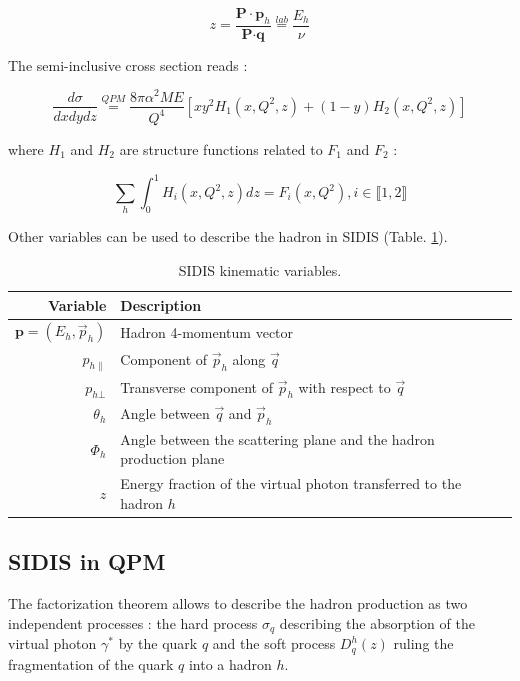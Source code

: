 \begin{equation}
  z = \frac{\textbf{P}\cdot\textbf{p}_h}{\textbf{P}\cdot\textbf{q}} \stackrel{lab}{=} \frac{E_h}{\nu}
  \label{eq:SIDIS}
\end{equation}

The semi-inclusive cross section reads \cite{SIDISXS}:

\begin{equation}
  \frac{d\sigma}{dxdydz} \stackrel{QPM}{=} \frac{8\pi\alpha^2ME}{Q^4}\left[xy^2H_1(x,Q^2,z)+(1-y)H_2(x,Q^2,z)\right]
  \label{eq:SIDISXS}
\end{equation}

where $H_1$ and $H_2$ are structure functions related to $F_1$ and $F_2$ \cite{SF} :

\begin{equation}
  \sum\limits_{h}\int_{0}^{1} H_i(x,Q^2,z)dz = F_i(x,Q^2), i \in  \llbracket1,2\rrbracket
\end{equation}

Other variables can be used to describe the hadron in SIDIS (Table. \ref{tab:SIDIS}).

\begin{table}[h!]
  \caption{SIDIS kinematic variables.}
  \label{tab:SIDIS}
  \begin{tabularx}{\textwidth}{r|lX}
    \hline
    \hline
    Variable & Description \\
    \hline
    \hline
    $\textbf{p}=(E_h,\vec{p}_h)$ & Hadron 4-momentum vector \\
    $p_{h\|}$ & Component of $\vec{p}_h$ along $\vec{q}$ \\
    $p_{h\bot}$ & Transverse component of $\vec{p}_h$ with respect to $\vec{q}$ \\
    $\theta_h$ & Angle between $\vec{q}$ and $\vec{p}_h$ \\
    $\Phi_h$ & Angle between the scattering plane and the hadron production plane \\
    $z$ & Energy fraction of the virtual photon transferred to the hadron $h$ \\
    \hline
    \hline
  \end{tabularx}
\end{table}

\subsection{SIDIS in QPM}

The factorization theorem allows to describe the hadron production as two independent processes : the hard process $\sigma_q$
describing the absorption of the virtual photon $\gamma^*$ by the quark $q$ and the soft process $D_q^h(z)$ ruling the
fragmentation of the quark $q$ into a hadron $h$.

